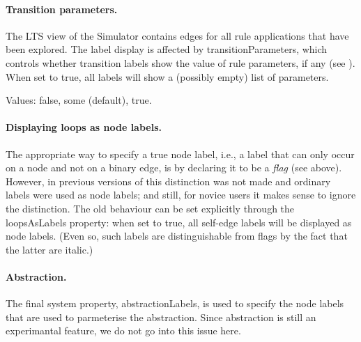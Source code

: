 \paragraph{Transition parameters.}

The LTS view of the Simulator contains edges for all rule applications that
have been explored. The label display is affected by
\textsf{transitionParameters}, which controls whether transition labels show
the value of rule parameters, if any (see ). When set to
\textsf{true}, all labels will show a (possibly empty) list of parameters.

Values: \textsf{false}, \textsf{some} (default), \textsf{true}.

\paragraph{Displaying loops as node labels.}

The appropriate way to specify a true node label, i.e., a label that can only
occur on a node and not on a binary edge, is by declaring it to be a
\emph{flag} (see above). However, in previous versions of \GROOVE this
distinction was not made and ordinary labels were used as node labels; and
still, for novice users it makes sense to ignore the distinction. The old
behaviour can be set explicitly through the \textsf{loopsAsLabels} property:
when set to \textsf{true}, all self-edge labels will be displayed as node
labels. (Even so, such labels are distinguishable from flags by the fact that
the latter are italic.)

\paragraph{Abstraction.}

The final system property, \textsf{abstractionLabels}, is used to specify the
node labels that are used to parmeterise the abstraction. Since abstraction is
still an experimantal feature, we do not go into this issue here.
